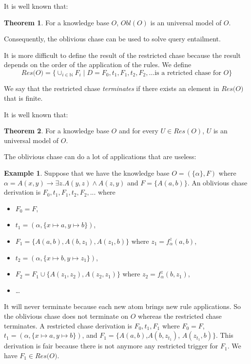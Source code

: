 \documentclass{article}
\theoremstyle{definition}
\newtheorem{theorem}{Theorem}[section]
\newtheorem{example}{Example}[section]
\theoremstyle{remark}
\def \N {\mathbb N}
\begin{document}
It is well known that:

\begin{theorem}
For a knowledge base $O$, $\textit{Obl}(O)$ is an universal model of $O$.
\end{theorem}

Consequently, the oblivious chase can be used to solve query entailment.

It is more difficult to define the result of the restricted chase because the result depends on the order of the application of the rules. We define $$\textit{Res(O)}=\{\cup_{i \in \N}F_i \mid D = F_0,t_1,F_1,t_2,F_2,\ldots \text{is a retricted chase for } O\}$$

We say that the restricted chase \emph{terminates} if there exists an element in $\textit{Res(O)}$ that is finite.

It is well known that:

\begin{theorem}
For a knowledge base $O$ and for every $U \in \textit{Res}(O)$, $U$ is an universal model of $O$.
\end{theorem}


The oblivious chase  can do a lot of applications that are useless: 
\begin{example}
Suppose that we have the knowledge base $O=(\{\alpha\},F)$ where $\alpha = A(x,y) \rightarrow \exists z.A(y,z) \wedge A(z,y)$ and $F =  \{A(a,b)\}$. An oblivious chase derivation is $F_0,t_1,F_1,t_2,F_2,...$ where
\begin{itemize}
\item $F_0 = F$, 
\item $t_1=(\alpha,\{x \mapsto a, y \mapsto b\})$, 
\item $F_1=\{A(a,b),A(b,z_1),A(z_1,b)\}$ where $z_1 =f_\alpha^z(a,b)$,
\item $t_2=(\alpha,\{x \mapsto b, y \mapsto z_1\})$, 
\item $F_2=F_1 \cup \{ A(z_1,z_2), A(z_2,z_1)\}$ where $z_2= f_\alpha^z(b,z_1)$, 
\item \ldots\ 
\end{itemize} 
It will never terminate because each new atom brings new rule applications. So the oblivious chase does not terminate on $O$ whereas the restricted chase terminates. A restricted chase derivation is $F_0,t_1,F_1$ where $F_0 = F$, $t_1=(\alpha,\{x \mapsto a, y \mapsto b\})$, and $F_1=\{A(a,b)$,$A(b,z_{t_1})$, $A(z_{t_1},b)\}$. This derivation is fair because there is not anymore any restricted trigger for $F_1$. We have $F_1 \in \textit{Res(O)}$.
\end{example}
\end{document}
